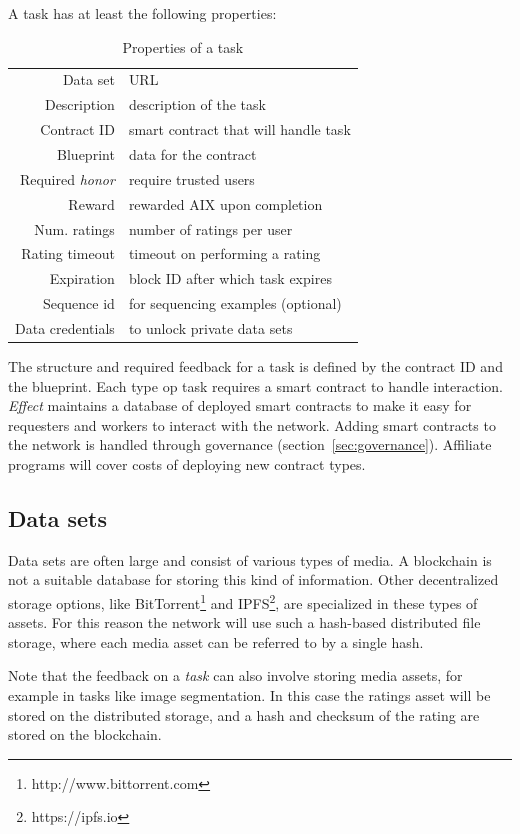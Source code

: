 \documentclass{article}
\begin{document}
A task has at least the following properties:

\begin{table}[h]
  \centering
  \begin{tabular}[h]{r|l}
    Data set & URL \\
    Description & description of the task \\ 
    Contract ID & smart contract that will handle task \\
    Blueprint & data for the contract \\ 
    Required \emph{honor} & require trusted users \\
    Reward & rewarded AIX upon completion \\
    Num. ratings & number of ratings per user \\
    Rating timeout & timeout on performing a rating \\ 
    Expiration  & block ID after which task expires \\
    Sequence id & for sequencing examples (optional)\\
    Data credentials & to unlock private data sets \\
  \end{tabular}
  \caption{Properties of a task}
  \label{tab:task}
\end{table}

The structure and required feedback for a task is defined by the
contract ID and the blueprint. Each type op task requires a smart
contract to handle interaction. \emph{Effect} maintains a database 
of deployed
smart contracts to make it easy for requesters and workers to interact
with the network. Adding smart contracts to the network is handled
through governance (section~\ref{sec:governance}). Affiliate programs
will cover costs of deploying new contract types. 

\subsection{Data sets}
Data sets are often large and consist of various types of media. A
blockchain is not a suitable database for storing this kind of
information. Other decentralized storage options, like
BitTorrent\footnote{http://www.bittorrent.com} and IPFS\footnote{https://ipfs.io}, are specialized in these
types of assets. For this reason the network will use such a
hash-based distributed file storage, where each media asset can be
referred to by a single hash.

Note that the feedback on a \emph{task} can also involve storing media
assets, for example in tasks like image segmentation. In this case the
ratings asset will be stored on the distributed storage, and a hash
and checksum of the rating are stored on the blockchain.
\end{document}
